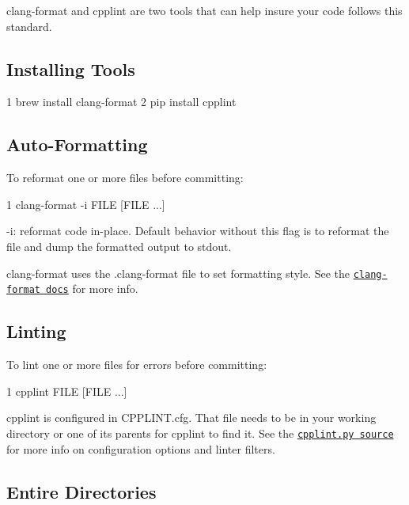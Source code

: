 clang-\/format and cpplint are two tools that can help insure your code follows this standard.

\subsection*{Installing Tools}


\begin{DoxyCode}
1 brew install clang-format
2 pip install cpplint
\end{DoxyCode}


\subsection*{Auto-\/\+Formatting}

To reformat one or more files before committing\+:


\begin{DoxyCode}
1 clang-format -i FILE [FILE ...]
\end{DoxyCode}


{\ttfamily -\/i}\+: reformat code in-\/place. Default behavior without this flag is to reformat the file and dump the formatted output to stdout.

clang-\/format uses the {\ttfamily .clang-\/format} file to set formatting style. See the \href{http://clang.llvm.org/docs/ClangFormat.html}{\tt clang-\/format docs} for more info.

\subsection*{Linting}

To lint one or more files for errors before committing\+:


\begin{DoxyCode}
1 cpplint FILE [FILE ...]
\end{DoxyCode}


cpplint is configured in {\ttfamily C\+P\+P\+L\+I\+N\+T.\+cfg}. That file needs to be in your working directory or one of its parents for cpplint to find it. See the \href{https://google-styleguide.googlecode.com/svn/trunk/cpplint/cpplint.py}{\tt cpplint.\+py source} for more info on configuration options and linter filters.

\subsection*{Entire Directories}

